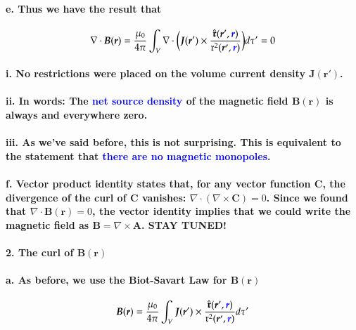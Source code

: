 \documentclass{article}
\begin{document}
\paragraph{\indent e. Thus we have the result that}
\begin{equation*}
    \nabla\cdot\boldsymbol{B}(\boldsymbol{r})=\frac{\mu_0}{4\pi}\int_V \nabla\cdot\bigg(\boldsymbol{J}(\boldsymbol{r}')\times\frac{\hat{\boldsymbol{\mathfrak{r}}}(\boldsymbol{r}',\textcolor{blue}{\boldsymbol{r}})}{\mathfrak{r}^2(\boldsymbol{r}',\textcolor{blue}{\boldsymbol{r}})}\bigg)d\tau'=0
\end{equation*}
\paragraph{\indent\indent i. No restrictions were placed on the volume current density $\boldsymbol{J}(\boldsymbol{r}')$.}
\paragraph{\indent\indent ii. In words: The \textcolor{blue}{net source density} of the magnetic field $\boldsymbol{B}(\boldsymbol{r})$ is always and everywhere zero.}
\paragraph{\indent\indent iii. As we've said before, this is not surprising. This is equivalent to the statement that \textcolor{blue}{there are no magnetic monopoles}.}
\paragraph{\indent f. Vector product identity states that, for any vector function $\boldsymbol{C}$, the divergence of the curl of $\boldsymbol{C}$ vanishes: $\nabla\cdot(\nabla\times\boldsymbol{C})=0$. Since we found that $\nabla\cdot\boldsymbol{B}(\boldsymbol{r})=0$, the vector identity implies that we could write the magnetic field as $\boldsymbol{B}=\nabla\times\boldsymbol{A}$. STAY TUNED!}
\paragraph{2. The curl of $\boldsymbol{B}(\boldsymbol{r})$}
\paragraph{\indent a. As before, we use the Biot-Savart Law for $\boldsymbol{B}(\boldsymbol{r})$ }
\begin{equation*}
    \boldsymbol{B}(\boldsymbol{r})=\frac{\mu_0}{4\pi}\int_V \boldsymbol{J}(\boldsymbol{r}')\times\frac{\hat{\boldsymbol{\mathfrak{r}}}(\boldsymbol{r}',\textcolor{blue}{\boldsymbol{r}})}{\mathfrak{r}^2(\boldsymbol{r}',\textcolor{blue}{\boldsymbol{r}})}d\tau'
\end{equation*}
\end{document}

